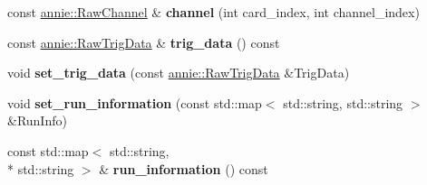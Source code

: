 \begin{DoxyCompactItemize}
\item 
\hypertarget{classannie_1_1RawReadout_ac37668ed3755818512309f1b83bdf1ae}{const \hyperlink{classannie_1_1RawChannel}{annie\-::\-Raw\-Channel} \& {\bfseries channel} (int card\-\_\-index, int channel\-\_\-index)}\label{classannie_1_1RawReadout_ac37668ed3755818512309f1b83bdf1ae}

\item 
\hypertarget{classannie_1_1RawReadout_aefe2a5354731f34444e74255fd5a0cc2}{const \hyperlink{classannie_1_1RawTrigData}{annie\-::\-Raw\-Trig\-Data} \& {\bfseries trig\-\_\-data} () const }\label{classannie_1_1RawReadout_aefe2a5354731f34444e74255fd5a0cc2}

\item 
\hypertarget{classannie_1_1RawReadout_a4c9c106ed001152f2ba692ffa8bac46f}{void {\bfseries set\-\_\-trig\-\_\-data} (const \hyperlink{classannie_1_1RawTrigData}{annie\-::\-Raw\-Trig\-Data} \&Trig\-Data)}\label{classannie_1_1RawReadout_a4c9c106ed001152f2ba692ffa8bac46f}

\item 
\hypertarget{classannie_1_1RawReadout_ab21d5580b782f2a7d636dd2686b6fc3f}{void {\bfseries set\-\_\-run\-\_\-information} (const std\-::map$<$ std\-::string, std\-::string $>$ \&Run\-Info)}\label{classannie_1_1RawReadout_ab21d5580b782f2a7d636dd2686b6fc3f}

\item 
\hypertarget{classannie_1_1RawReadout_a437ecbef57b303fa307e6f19ec26d698}{const std\-::map$<$ std\-::string, \\*
std\-::string $>$ \& {\bfseries run\-\_\-information} () const }\label{classannie_1_1RawReadout_a437ecbef57b303fa307e6f19ec26d698}

\end{DoxyCompactItemize}
